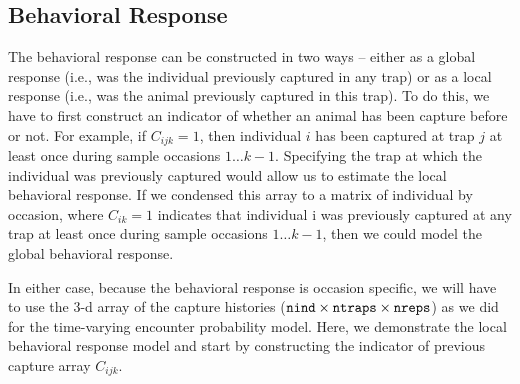 \subsection{Behavioral Response}

The behavioral response can be constructed in two ways -- either as a
global response (i.e., was the individual previously captured in any trap) or
as a local response (i.e., was the animal previously captured in this
trap).  To do this, we have to first
construct an indicator of whether an animal has been capture before or not.  For
example, if $C_{ijk} = 1$, then individual $i$ has been captured at trap $j$
 at least once during
sample occasions $1 \dots k-1$.  Specifying the trap at which the individual was
previously captured would allow us to estimate the local behavioral response.  If
we condensed this array to a matrix of individual by occasion, where $C_{ik} = 1$ indicates
that individual i was previously captured at any trap at least once during
sample occasions $1 \dots k-1$, then we
could model the global behavioral response.

In either case, because the behavioral response is occasion specific, we will have to use the 3-d array of the
capture histories ($\mbox{\tt nind} \times \mbox{\tt ntraps} \times
\mbox{\tt nreps}$) as we did for the time-varying encounter probability
model.
Here, we demonstrate the local behavioral response model and start by constructing the
indicator of previous capture array $C_{ijk}$.


